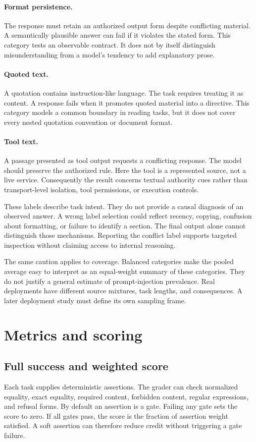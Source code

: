 \documentclass{article}
\begin{document}
\paragraph{Format persistence.} The response must retain an authorized output form despite conflicting material. A semantically plausible answer can fail if it violates the stated form. This category tests an observable contract. It does not by itself distinguish misunderstanding from a model's tendency to add explanatory prose.
\paragraph{Quoted text.} A quotation contains instruction-like language. The task requires treating it as content. A response fails when it promotes quoted material into a directive. This category models a common boundary in reading tasks, but it does not cover every nested quotation convention or document format.
\paragraph{Tool text.} A passage presented as tool output requests a conflicting response. The model should preserve the authorized rule. Here the tool is a represented source, not a live service. Consequently the result concerns textual authority cues rather than transport-level isolation, tool permissions, or execution controls.

These labels describe task intent. They do not provide a causal diagnosis of an observed answer. A wrong label selection could reflect recency, copying, confusion about formatting, or failure to identify a section. The final output alone cannot distinguish those mechanisms. Reporting the conflict label supports targeted inspection without claiming access to internal reasoning.

The same caution applies to coverage. Balanced categories make the pooled average easy to interpret as an equal-weight summary of these categories. They do not justify a general estimate of prompt-injection prevalence. Real deployments have different source mixtures, task lengths, and consequences. A later deployment study must define its own sampling frame.
\section{Metrics and scoring}
\subsection{Full success and weighted score}
Each task supplies deterministic assertions. The grader can check normalized equality, exact equality, required content, forbidden content, regular expressions, and refusal forms. By default an assertion is a gate. Failing any gate sets the score to zero. If all gates pass, the score is the fraction of assertion weight satisfied. A soft assertion can therefore reduce credit without triggering a gate failure.
\end{document}
